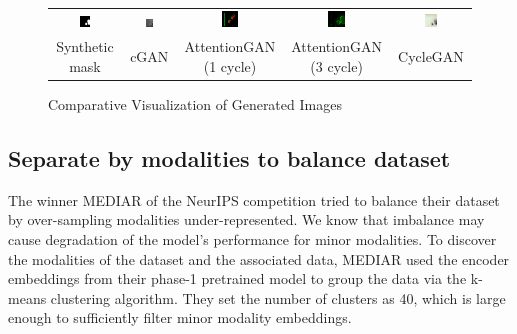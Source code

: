 \documentclass[]{article}
\begin{document}
\begin{figure}[t]
    \centering
    \begin{tabular}{ccccc}
        \includegraphics[width=0.18\textwidth]{reports/images/mask.png} & 
        \includegraphics[width=0.18\textwidth]{reports/images/cgan_unet.png} & 
        \includegraphics[width=0.18\textwidth]{reports/images/attention_gan_1_cycle.png} & 
        \includegraphics[width=0.18\textwidth]{reports/images/attention_gan_3_cycles.png} & 
        \includegraphics[width=0.18\textwidth]{reports/images/cycle_gan.png} \\
        Synthetic mask & cGAN & AttentionGAN (1 cycle) & AttentionGAN (3 cycle) & CycleGAN
    \end{tabular}
    \caption{Comparative Visualization of Generated Images}
    \label{fig:image_matrix}
\end{figure}
\subsection{Separate by modalities to balance dataset}
The winner MEDIAR of the NeurIPS competition tried to balance their dataset by over-sampling modalities under-represented. We know that imbalance may cause degradation of the model’s performance for minor modalities. To discover the modalities of the dataset and the associated data, MEDIAR used the encoder embeddings from their phase-1 pretrained model to group the data via the k-means clustering algorithm. They set the number of clusters as 40, which is large enough to sufficiently filter minor modality embeddings. 
\end{document}
